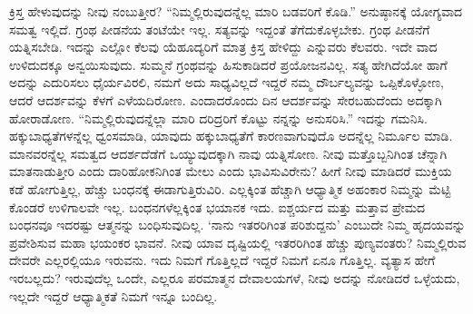 ಕ್ರಿಸ್ತ ಹೇಳುವುದನ್ನು ನೀವು ನಂಬುತ್ತೀರ? “ನಿಮ್ಮಲ್ಲಿರುವುದನ್ನೆಲ್ಲ ಮಾರಿ ಬಡವರಿಗೆ ಕೊಡಿ.” ಅನುಷ್ಠಾನಕ್ಕೆ ಯೋಗ್ಯವಾದ ಸಮತ್ವ ಇಲ್ಲಿದೆ. ಗ್ರಂಥ ಪೀಡನೆಯ ತಂಟೆಯೇ ಇಲ್ಲ. ಸತ್ಯವನ್ನು ಇದ್ದಂತೆ ತೆಗೆದುಕೊಳ್ಳಬೇಕು. ಗ್ರಂಥ ಪೀಡನೆಗೆ ಯತ್ನಿಸಬೇಡಿ. ಇದನ್ನು ಎಲ್ಲೋ ಕೆಲವು ಯೆಹೂದ್ಯರಿಗೆ ಮಾತ್ರ ಕ್ರಿಸ್ತ ಹೇಳಿದ್ದು ಎನ್ನುವರು ಕೆಲವರು. ಇದೇ ವಾದ ಉಳಿದುದಕ್ಕೂ ಅನ್ವಯಿಸುವುದು. ಸುಮ್ಮನೆ ಗ್ರಂಥವನ್ನು ಹಿಸುಕಾಡಿದರೆ ಪ್ರಯೋಜನವಿಲ್ಲ. ಸತ್ಯ ಹೇಗಿದೆಯೋ ಹಾಗೆ ಅದನ್ನು ಎದುರಿಸಲು ಧೈರ್ಯವಿರಲಿ, ನಮಗೆ ಅದು ಸಾಧ್ಯವಿಲ್ಲದೆ ಇದ್ದರೆ ನಮ್ಮ ದೌರ್ಬಲ್ಯವನ್ನು ಒಪ್ಪಿಕೊಳ್ಳೋಣ, ಆದರೆ ಆದರ್ಶವನ್ನು ಕೆಳಗೆ ಎಳೆಯದಿರೋಣ. ಎಂದಾದರೊಂದು ದಿನ ಆದರ್ಶವನ್ನು ಸೇರಬಹುದೆಂದು ಅದಕ್ಕಾಗಿ ಹೋರಾಡೋಣ. “ನಿಮ್ಮಲ್ಲಿರುವುದನ್ನೆಲ್ಲಾ ಮಾರಿ ದರಿದ್ರರಿಗೆ ಕೊಟ್ಟು ನನ್ನನ್ನು ಅನುಸರಿಸಿ.'' ಇದನ್ನು ಗಮನಿಸಿ. ಹಕ್ಕುಬಾಧ್ಯತೆಗಳನ್ನೆಲ್ಲ ಧ್ವಂಸಮಾಡಿ, ಯಾವುದು ಹಕ್ಕುಬಾಧ್ಯತೆಗೆ ಕಾರಣವಾಗುವುದೊ ಅದನ್ನೆಲ್ಲ ನಿರ್ಮೂಲ ಮಾಡಿ. ಮಾನವರನ್ನೆಲ್ಲ ಸಮತ್ವದ ಆದರ್ಶದೆಡೆಗೆ ಒಯ್ಯುವುದಕ್ಕಾಗಿ ನಾವು ಯತ್ನಿಸೋಣ. ನೀವು ಮತ್ತೊಬ್ಬನಿಗಿಂತ ಚೆನ್ನಾಗಿ ಮಾತನಾಡುತ್ತೀರಿ ಎಂದು ದಾರಿಹೋಕನಿಗಿಂತ ಮೇಲು ಎಂದು ಭಾವಿಸುವಿರೇನು? ಹೀಗೆ ನೀವು ಮಾಡಿದರೆ ಮುಕ್ತಿಯ ಕಡೆ ಹೋಗುತ್ತಿಲ್ಲ, ಹೆಚ್ಚು ಬಂಧನಕ್ಕೆ ಈಡಾಗುತ್ತಿರುವಿರಿ. ಎಲ್ಲಕ್ಕಿಂತ ಹೆಚ್ಚಾಗಿ ಆಧ್ಯಾತ್ಮಿಕ ಅಹಂಕಾರ ನಿಮ್ಮನ್ನು ಮೆಟ್ಟಿ ಕೊಂಡರೆ ಉಳಿಗಾಲವೇ ಇಲ್ಲ. ಬಂಧನಗಳೆಲ್ಲಕ್ಕಿಂತ ಭಯಾನಕ ಇದು. ಐಶ್ಚರ್ಯದ ಮತ್ತು ಮತ್ತಾವ ಪ್ರೇಮದ ಬಂಧನವೂ ಇದರಷ್ಟು ಆತ್ಮನನ್ನು ಬಂಧಿಸುವುದಿಲ್ಲ. `ನಾನು ಇತರರಿಗಿಂತ ಪರಿಶುದ್ದನು' ಎಂಬುದೇ ನಿಮ್ಮ ಹೃದಯವನ್ನು ಪ್ರವೇಶಿಸುವ ಮಹಾ ಭಯಂಕರ ಭಾವನೆ. ನೀವು ಯಾವ ದೃಷ್ಟಿಯಲ್ಲಿ ಇತರರಿಗಿಂತ ಹೆಚ್ಚು ಪುಣ್ಯವಂತರು? ನಿಮ್ಮಲ್ಲಿರುವ ದೇವರೇ ಎಲ್ಲರಲ್ಲಿಯೂ ಇರುವನು. ಇದು ನಿಮಗೆ ಗೊತ್ತಿಲ್ಲದೆ ಇದ್ದರೆ ನಿಮಗೆ ಏನೂ ಗೊತ್ತಿಲ್ಲ. ವ್ಯತ್ಯಾಸ ಹೇಗೆ ಇರಬಲ್ಲದು? ಇರುವುದೆಲ್ಲ ಒಂದೇ, ಎಲ್ಲರೂ ಪರಮಾತ್ಮನ ದೇವಾಲಯಗಳೆ, ನೀವು ಅದನ್ನು ನೋಡಿದರೆ ಒಳ್ಳೆಯದು, ಇಲ್ಲದೇ ಇದ್ದರೆ ಆಧ್ಯಾತ್ಮಿಕತೆ ನಿಮಗೆ ಇನ್ನೂ ಬಂದಿಲ್ಲ.

